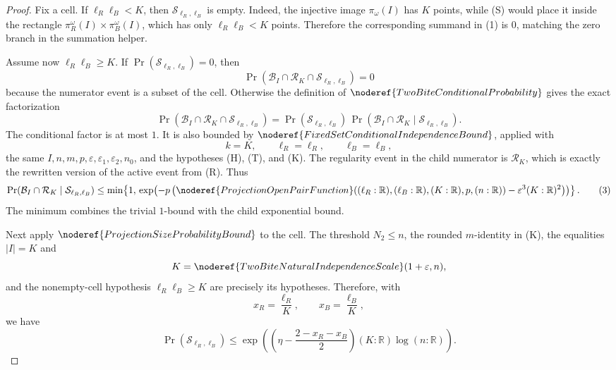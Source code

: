 \begin{proof}
Fix a cell.  If \(\ell_R\ell_B<K\), then
\(\mathcal S_{\ell_R,\ell_B}\) is empty.  Indeed, the injective image
\(\pi_\omega(I)\) has \(K\) points, while (S) would place it inside the
rectangle \(\pi_R^\omega(I)\times\pi_B^\omega(I)\), which has only
\(\ell_R\ell_B<K\) points.  Therefore the corresponding summand in (1) is
\(0\), matching the zero branch in the summation helper.

Assume now \(\ell_R\ell_B\ge K\).  If
\(\Pr(\mathcal S_{\ell_R,\ell_B})=0\), then
\[
\Pr(\mathcal B_I\cap\mathcal R_K\cap\mathcal S_{\ell_R,\ell_B})=0
\]
because the numerator event is a subset of the cell.  Otherwise the definition
of \(\noderef{TwoBiteConditionalProbability}\) gives the exact factorization
\[
\Pr(\mathcal B_I\cap\mathcal R_K\cap\mathcal S_{\ell_R,\ell_B})
=
\Pr(\mathcal S_{\ell_R,\ell_B})\,
\Pr(\mathcal B_I\cap\mathcal R_K\mid\mathcal S_{\ell_R,\ell_B}). \tag{2}
\]
The conditional factor is at most \(1\).  It is also bounded by
\(\noderef{FixedSetConditionalIndependenceBound}\), applied with
\[
k=K,\qquad \ell_R=\ell_R,\qquad \ell_B=\ell_B,
\]
the same \(I,n,m,p,\varepsilon,\varepsilon_1,\varepsilon_2,n_0\), and the
hypotheses (H), (T), and (K).  The regularity event in the child numerator is
\(\mathcal R_K\), which is exactly the rewritten version of the active event
from (R).  Thus
\[
\Pr(\mathcal B_I\cap\mathcal R_K\mid\mathcal S_{\ell_R,\ell_B})
\le
\min\!\left\{1,\,
\exp\!\left(
-p\left(
\noderef{ProjectionOpenPairFunction}
((\ell_R:\mathbb R),(\ell_B:\mathbb R),(K:\mathbb R),p,(n:\mathbb R))
-\varepsilon^3(K:\mathbb R)^2\right)\right)\right\}. \tag{3}
\]
The minimum combines the trivial \(1\)-bound with the child exponential bound.

Next apply \(\noderef{ProjectionSizeProbabilityBound}\) to the cell.  The
threshold \(N_2\le n\), the rounded \(m\)-identity in (K), the equalities
\(|I|=K\) and
\[
K=\noderef{TwoBiteNaturalIndependenceScale}(1+\varepsilon,n),
\]
and the nonempty-cell hypothesis \(\ell_R\ell_B\ge K\) are precisely its
hypotheses.  Therefore, with
\[
x_R=\frac{\ell_R}{K},\qquad x_B=\frac{\ell_B}{K},
\]
we have
\[
\Pr(\mathcal S_{\ell_R,\ell_B})
\le
\exp\!\left(
\left(\eta-\frac{2-x_R-x_B}{2}\right)(K:\mathbb R)\log(n:\mathbb R)
\right). \tag{4}
\]


\end{proof}
